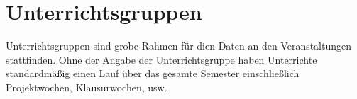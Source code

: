 \newpage
\section{Unterrichtsgruppen}

Unterrichtsgruppen sind grobe Rahmen für dien Daten an den Veranstaltungen stattfinden. Ohne der Angabe der Unterrichtsgruppe haben Unterrichte standardmäßig einen Lauf über das gesamte Semester einschließlich Projektwochen, Klausurwochen, usw.\\
\\